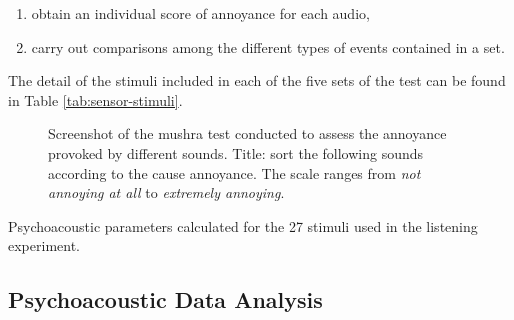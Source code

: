    \begin{enumerate}
     \item obtain an individual score of annoyance for each audio,
     \item carry out comparisons among the different types of events contained in a set.
   \end{enumerate}

   The detail of the stimuli included in each of the five sets of the test can be found in Table \ref{tab:sensor-stimuli}.

   \begin{figure}
     \label{fig:mushra-test}
     \centering
     \caption{Screenshot of the \gls{mushra} test conducted to assess the annoyance provoked by different sounds. Title: sort the following sounds according to the cause annoyance. The scale ranges from \emph{not annoying at all} to \emph{extremely annoying}.}
   \end{figure}

   \begin{table}
     \label{tab:sensor-stimuli}
     \centering
     \caption{Psychoacoustic parameters calculated for the 27 stimuli used in the listening experiment.}
   \end{table}

 \subsection{Psychoacoustic Data Analysis}

